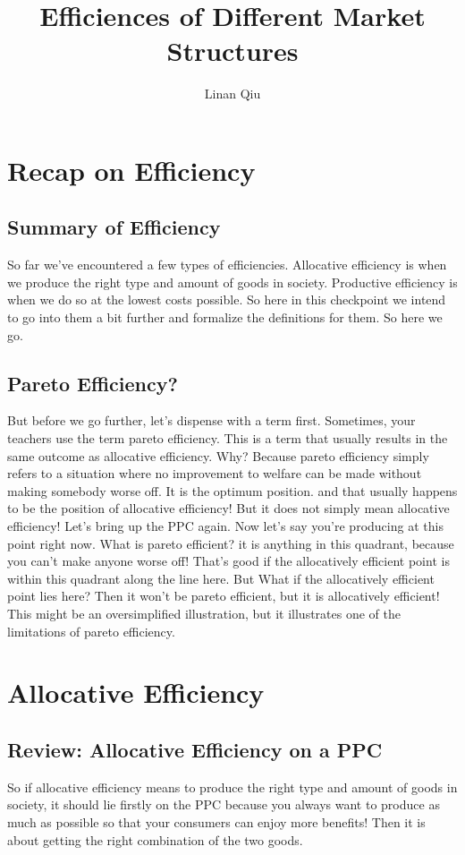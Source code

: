 \documentclass[DIV=classic,11pt,numbers=noenddot,listof=totoc,bibliography=totoc,parskip]{scrartcl}
\title{Efficiences of Different Market Structures}
\author{Linan Qiu}
\date{}
\begin{document}
\maketitle
\tableofcontents
\newpage
\section{Recap on Efficiency}
\subsection{Summary of Efficiency}
So far we’ve encountered a few types of efficiencies. Allocative efficiency is when we produce the right type and amount of goods in society. Productive efficiency is when we do so at the lowest costs possible. So here in this checkpoint we intend to go into them a bit further and formalize the definitions for them. So here we go.
\subsection{Pareto Efficiency?}
But before we go further, let’s dispense with a term first. Sometimes, your teachers use the term pareto efficiency. This is a term that usually results in the same outcome as allocative efficiency. Why? Because pareto efficiency simply refers to a situation where no improvement to welfare can be made without making somebody worse off. It is the optimum position. and that usually happens to be the position of allocative efficiency! But it does not simply mean allocative efficiency! Let’s bring up the PPC again. Now let’s say you’re producing at this point right now. What is pareto efficient? it is anything in this quadrant, because you can’t make anyone worse off! That’s good if the allocatively efficient point is within this quadrant along the line here. But What if the allocatively efficient point lies here? Then it won’t be pareto efficient, but it is allocatively efficient! This might be an oversimplified illustration, but it illustrates one of the limitations of pareto efficiency.
\newpage
\section{Allocative Efficiency}
\subsection{Review: Allocative Efficiency on a PPC}
So if allocative efficiency means to produce the right type and amount of goods in society, it should lie firstly on the PPC because you always want to produce as much as possible so that your consumers can enjoy more benefits! Then it is about getting the right combination of the two goods. 
\end{document}
